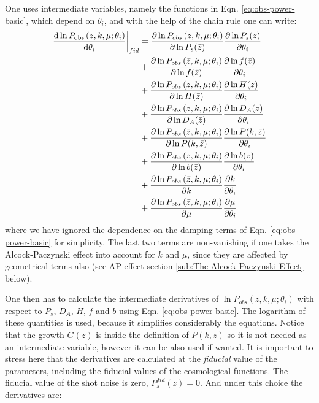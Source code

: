 	
	One uses intermediate variables, namely the functions in Eqn. \ref{eq:obs-power-basic},
	which depend on $\theta_{i}$, and with the help of the chain rule
	one can write:
	\begin{align}\label{eq:derivatives-of-lnPobs} 
	\left.\frac{\mbox{d}\ln P_{{\rm obs}}\left(\bar{z},k,\mu;\theta_{i}\right)}{\mbox{d}\theta_{i}}\right|_{fid} & =\frac{\partial\ln P_{obs}\left(\bar{z},k,\mu;\theta_{i}\right)}{\partial\ln P_{s}(\bar{z})}\frac{\partial\ln P_{s}(\bar{z})}{\partial\theta_{i}} \\
	& +\frac{\partial\ln P_{obs}\left(\bar{z},k,\mu;\theta_{i}\right)}{\partial\ln f(\bar{z})}\frac{\partial\ln f(\bar{z})}{\partial\theta_{i}}\nonumber \\
	& +\frac{\partial\ln P_{obs}\left(\bar{z},k,\mu;\theta_{i}\right)}{\partial\ln H(\bar{z})}\frac{\partial\ln H(\bar{z})}{\partial\theta_{i}} \nonumber \\ 
	& +\frac{\partial\ln P_{obs}\left(\bar{z},k,\mu;\theta_{i}\right)}{\partial\ln D_{A}(\bar{z})}\frac{\partial\ln D_{A}(\bar{z})}{\partial\theta_{i}}\nonumber \\
	& +\frac{\partial\ln P_{obs}\left(\bar{z},k,\mu;\theta_{i}\right)}{\partial\ln P(k,\bar{z})}\frac{\partial\ln P(k,\bar{z})}{\partial\theta_{i}} \nonumber \\ 
	& +\frac{\partial\ln P_{obs}\left(\bar{z},k,\mu;\theta_{i}\right)}{\partial\ln b(\bar{z})}\frac{\partial\ln b(\bar{z})}{\partial\theta_{i}}\nonumber\\
	& +\frac{\partial\ln P_{obs}\left(\bar{z},k,\mu;\theta_{i}\right)}{\partial k}\frac{\partial k}{\partial\theta_{i}} \nonumber \\
	& +\frac{\partial\ln P_{obs}\left(\bar{z},k,\mu;\theta_{i}\right)}{\partial\mu}\frac{\partial\mu}{\partial\theta_{i}}\nonumber 
	\end{align}
	where we have ignored the dependence on the damping terms of Eqn.
	\ref{eq:obs-power-basic} for simplicity. The last two terms are non-vanishing
	if one takes the Alcock-Paczynski effect into account for $k$ and
	$\mu$, since they are affected by geometrical terms also (see AP-effect
	section \ref{sub:The-Alcock-Paczynski-Effect} below).

One then has to calculate the intermediate derivatives of $\ln P_{obs}(z,k,\mu;\theta_{i})$
with respect to $P_{s}$, $D_{A}$, $H$, $f$ and $b$ using Eqn.
\ref{eq:obs-power-basic}. The logarithm of these quantities is used,
because it simplifies considerably the equations. Notice that the
growth $G(z)$ is inside the definition of $P(k,z)$ so it is not
needed as an intermediate variable, however it can be also used if
wanted. It is important to stress here that the derivatives are calculated
at the \emph{fiducial} value of the parameters, including the fiducial
values of the cosmological functions. The fiducial value of the shot
noise is zero, $P_{s}^{fid}(z)=0$. And under this choice the derivatives
are:

